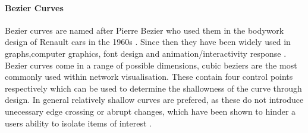 \paragraph*{Bezier Curves}
Bezier curves are named after Pierre Bezier who used them in the bodywork design of Renault cars in the 1960s \citep{beziermath}. Since then they have been widely used in graphs,computer graphics, font design and animation/interactivity response \citep{bezier,beziermath,beziercomputer}. Bezier curves come in a range of possible dimensions, cubic beziers are the most commonly used within network visualisation. These contain four control points respectively which can be used to determine the shallowness of the curve through design. In general relatively shallow curves are prefered, as these do not introduce unecessary edge crossing or abrupt changes, which have been shown to hinder a users ability to isolate items of interest \citep{ch6graphredability}.


